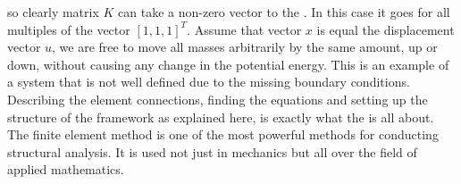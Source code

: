 so clearly matrix $K$ can take a non-zero vector to
the . In this case it goes for all multiples of the vector
$[1,1,1]^T$. Assume that vector $x$ is equal the displacement vector $u$, we are free to
move all masses arbitrarily by the same amount, up or down, without causing any
change in the potential energy. This is an example of a system that is not well defined
due to the missing boundary conditions. \\




  


Describing the element connections, finding the equations
and setting up the structure of the framework as explained here, is
exactly what the  is all about. 
The finite element method is one of the most powerful methods for
conducting structural analysis. It is used not
just in mechanics but all over the field of applied
mathematics. \\




 

